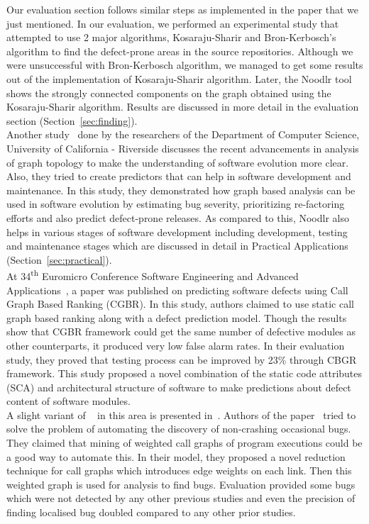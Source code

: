 Our evaluation section follows similar steps as implemented in the paper that we just mentioned. In our evaluation, we performed an experimental study that attempted to use 2 major algorithms, Kosaraju-Sharir and Bron-Kerbosch's algorithm to find the defect-prone areas in the source repositories. Although we were unsuccessful with Bron-Kerbosch algorithm, we managed to get some results out of the implementation of Kosaraju-Sharir algorithm. Later, the Noodlr tool shows the strongly connected components on the graph obtained using the Kosaraju-Sharir algorithm. Results are discussed in more detail in the evaluation section (Section~\ref{sec:finding}). \\

Another study~\cite{bhattacharya2012graph} done by the researchers of the Department of Computer Science, University of California - Riverside discusses the recent advancements in analysis of graph topology to make the understanding of software evolution more clear. Also, they tried to create predictors that can help in software development and maintenance. In this study, they demonstrated how graph based analysis can be used in software evolution by estimating bug severity, prioritizing re-factoring efforts and also predict defect-prone releases. As compared to this, Noodlr also helps in various stages of software development including development, testing and maintenance stages which are discussed in detail in Practical Applications (Section~\ref{sec:practical}). \\

At 34\textsuperscript{th} Euromicro Conference Software Engineering and Advanced Applications~\cite{turhan2008software}, a paper was published on predicting software defects using Call Graph Based Ranking (CGBR). In this study, authors claimed to use static call graph based ranking along with a defect prediction model. Though the results show that CGBR framework could get the same number of defective modules as other counterparts, it produced very low false alarm rates. In their evaluation study, they proved that testing process can be improved by 23\% through CBGR framework. This study proposed a novel combination of the static code attributes (SCA) and architectural structure of software to make predictions about defect content of software modules.\\

A slight variant of ~\cite{turhan2008software} in this area is presented in~\cite{eichinger2008mining}. Authors of the paper~\cite{eichinger2008mining} tried to solve the problem of automating the discovery of non-crashing occasional bugs. They claimed that mining of weighted call graphs of program executions could be a good way to automate this. In their model, they proposed a novel reduction technique for call graphs which introduces edge weights on each link. Then this weighted graph is used for analysis to find bugs. Evaluation provided some bugs which were not detected by any other previous studies and even the precision of finding localised bug doubled compared to any other prior studies.\\

